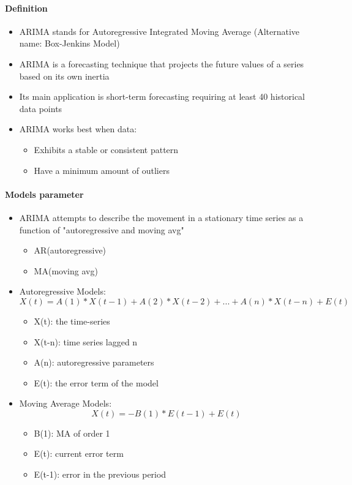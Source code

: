 \documentclass[11pt]{article}
\providecommand{\tightlist}{%
      \setlength{\itemsep}{0pt}\setlength{\parskip}{0pt}}
\begin{document}
\paragraph{Definition}\label{definition-2}

\begin{itemize}
\tightlist
\item
  ARIMA stands for Autoregressive Integrated Moving Average (Alternative
  name: Box-Jenkins Model)
\item
  ARIMA is a forecasting technique that projects the future values of a
  series based on its own inertia
\item
  Its main application is short-term forecasting requiring at least 40
  historical data points
\item
  ARIMA works best when data:

  \begin{itemize}
  \tightlist
  \item
    Exhibits a stable or consistent pattern
  \item
    Have a minimum amount of outliers
  \end{itemize}
\end{itemize}

\paragraph{Models parameter}\label{models-parameter}

\begin{itemize}
\tightlist
\item
  ARIMA attempts to describe the movement in a stationary time series as
  a function of "autoregressive and moving avg"

  \begin{itemize}
  \tightlist
  \item
    AR(autoregressive)
  \item
    MA(moving avg)
  \end{itemize}
\item
  Autoregressive Models:
  \[X(t) = A(1)*X(t-1) + A(2)*X(t-2) +... + A(n)*X(t-n) + E(t)\]

  \begin{itemize}
  \tightlist
  \item
    X(t): the time-series
  \item
    X(t-n): time series lagged n
  \item
    A(n): autoregressive parameters
  \item
    E(t): the error term of the model
  \end{itemize}
\item
  Moving Average Models: \[X(t) = -B(1) * E(t-1) + E(t)\]

  \begin{itemize}
  \tightlist
  \item
    B(1): MA of order 1
  \item
    E(t): current error term
  \item
    E(t-1): error in the previous period
  \end{itemize}
\end{itemize}
\end{document}
